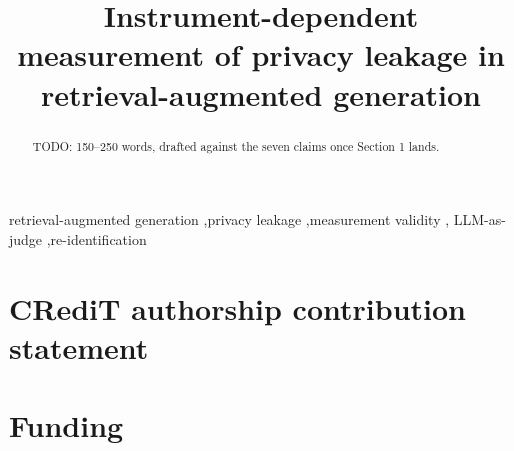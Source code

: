 \documentclass[a4paper,fleqn]{cas-sc}
\begin{document}
\title[mode=title]{Instrument-dependent measurement of privacy leakage in
retrieval-augmented generation}

\author[1]{}

\begin{abstract}
TODO: 150--250 words, drafted against the seven claims once Section 1 lands.
\end{abstract}

\begin{keywords}
retrieval-augmented generation \sep privacy leakage \sep measurement validity \sep
LLM-as-judge \sep re-identification
\end{keywords}

\maketitle









\section*{CRediT authorship contribution statement}

\section*{Funding}
\end{document}
